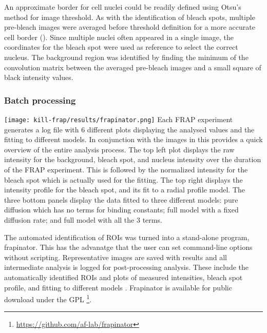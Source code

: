       An approximate border for cell nuclei could be readily defined using Otsu's method for image threshold. 
	  As with the identification of bleach spots, multiple pre-bleach images
      were averaged before threshold definition for a more accurate cell border ().
      Since multiple nuclei often appeared in a single image, the coordinates for the bleach spot 
	  were used as reference to select the correct nucleus. 
	  The background region was identified by finding the minimum of the convolution matrix 
	  between the averaged pre-bleach images and a small square of black intensity values.

    \subsubsection{Batch processing}

      \begin{sidewaysfigure}
        \texttt{[image: kill-frap/results/frapinator.png]}
          {
            Each FRAP experiment generates a log file with 6 different plots
            displaying the analysed values and the fitting to different models.
            In conjunction with the images in  this
            provides a quick overview of the entire analysis process.
            The top left plot displays the raw intensity
            for the background, bleach spot, and nucleus intensity over the
            duration of the FRAP experiment. This is followed by the normalized
            intensity for the bleach spot which is actually used for the
            fitting. The top right displays the intensity
            profile for the bleach spot, and its fit to a radial profile
            model. The three bottom panels display the data fitted to three
            different models: pure diffusion which has no terms for binding
            constants; full model with a fixed diffusion rate; and full model
            with all the 3 terms.
          }
        \label{fig:kill-frap:frapinator}
      \end{sidewaysfigure}

      The automated identification of ROIs was turned into a stand-alone program, frapinator. 
	  This has the advanatge that the user can set command-line options without scripting. 
	  Representative images are saved with results and all intermediate analysis is logged for post-processing analysis.
      These include the automatically identified ROIs and 
	  plots of measured intensities, bleach spot profile, and fitting to different models .
      Frapinator is available for public download under the GPL \footnote{\url{https://github.com/af-lab/frapinator}}.

